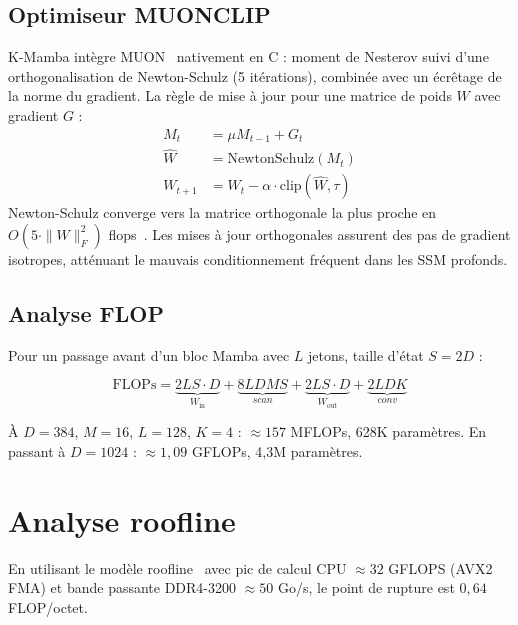\documentclass[10pt,onecolumn]{article}
\begin{document}
\subsection{Optimiseur MUONCLIP}

K-Mamba intègre MUON~\cite{muon2025} nativement en C :
moment de Nesterov suivi d'une orthogonalisation de Newton-Schulz
(5 itérations), combinée avec un écrêtage de la norme du gradient.
La règle de mise à jour pour une matrice de poids $W$ avec gradient $G$ :
\begin{align}
  M_t &= \mu M_{t-1} + G_t \\
  \hat{W} &= \text{NewtonSchulz}(M_t) \\
  W_{t+1} &= W_t - \alpha \cdot \text{clip}(\hat{W}, \tau)
\end{align}
Newton-Schulz converge vers la matrice orthogonale la plus proche en
$O(5 \cdot \|W\|_F^2)$ flops~\cite{bjorck1971}.
Les mises à jour orthogonales assurent des pas de gradient isotropes,
atténuant le mauvais conditionnement fréquent dans les SSM profonds.

\subsection{Analyse FLOP}

Pour un passage avant d'un bloc Mamba avec $L$ jetons, taille d'état $S = 2D$ :

\begin{equation}
  \text{FLOPs} = \underbrace{2LS \cdot D}_{W_\text{in}}
               + \underbrace{8LDMS}_{scan}
               + \underbrace{2LS \cdot D}_{W_\text{out}}
               + \underbrace{2LDK}_{conv}
\end{equation}

À $D = 384$, $M = 16$, $L = 128$, $K = 4$ : $\approx 157$ MFLOPs,
628K paramètres. En passant à $D = 1024$ : $\approx 1,09$ GFLOPs, 4,3M paramètres.

\section{Analyse roofline}
\label{sec:roofline}

En utilisant le modèle roofline~\cite{williams2009roofline} avec
pic de calcul CPU $\approx 32$ GFLOPS (AVX2 FMA) et
bande passante DDR4-3200 $\approx 50$ Go/s,
le point de rupture est $0,64$ FLOP/octet.
\end{document}
